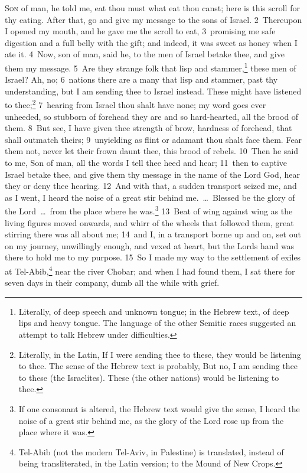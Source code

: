 \documentclass[10pt]{book} %
\begin{document}
\lettrine[lines=2]{S}{on} of man, he told me, eat thou must what eat thou canst; here is this scroll for thy eating. After that, go and give my message to the sons of Israel. \textcolor{benred8}{2}~Thereupon I opened my mouth, and he gave me the scroll to eat, \textcolor{benred8}{3}~promising me safe digestion and a full belly with the gift; and indeed, it was sweet as honey when I ate it. \textcolor{benred8}{4}~Now, son of man, said he, to the men of Israel betake thee, and give them my message. \textcolor{benred8}{5}~Are they strange folk that lisp and stammer,\footnote[1]{Literally, \textasciigrave of deep speech and unknown tongue\textquotesingle ; in the Hebrew text, \textasciigrave of deep lips and heavy tongue\textquotesingle . The language of the other Semitic races suggested an attempt to talk Hebrew under difficulties.} these men of Israel? Ah, no; \textcolor{benred8}{6}~nations there are a many that lisp and stammer, past thy understanding, but I am sending thee to Israel instead. These might have listened to thee;\footnote[2]{Literally, in the Latin, \textasciigrave If I were sending thee to these, they would be listening to thee\textquotesingle . The sense of the Hebrew text is probably, \textasciigrave But no, I am sending thee to these (the Israelites). These (the other nations) would be listening to thee\textquotesingle .} \textcolor{benred8}{7}~hearing from Israel thou shalt have none; my word goes ever unheeded, so stubborn of forehead they are and so hard-hearted, all the brood of them. \textcolor{benred8}{8}~But see, I have given thee strength of brow, hardness of forehead, that shall outmatch theirs; \textcolor{benred8}{9}~unyielding as flint or adamant thou shalt face them. Fear them not, never let their frown daunt thee, this brood of rebels.
\textcolor{benred8}{10}~Then he said to me, Son of man, all the words I tell thee heed and hear; \textcolor{benred8}{11}~then to captive Israel betake thee, and give them thy message in the name of the Lord God, hear they or deny thee hearing. \textcolor{benred8}{12}~And with that, a sudden transport seized me, and as I went, I heard the noise of a great stir behind me.~\ldots\  Blessed be the glory of the Lord~\ldots\  from the place where he was.\footnote[3]{If one consonant is altered, the Hebrew text would give the sense, \textasciigrave I heard the noise of a great stir behind me, as the glory of the Lord rose up from the place where it was\textquotesingle .} \textcolor{benred8}{13}~Beat of wing against wing as the living figures moved onwards, and whirr of the wheels that followed them, great stirring there was all about me; \textcolor{benred8}{14}~and I, in a transport borne up and on, set out on my journey, unwillingly enough, and vexed at heart, but the Lord\textquotesingle s hand was there to hold me to my purpose. \textcolor{benred8}{15}~So I made my way to the settlement of exiles at Tel-Abib,\footnote[4]{Tel-Abib (not the modern Tel-Aviv, in Palestine) is translated, instead of being transliterated, in the Latin version; \textasciigrave to the Mound of New Crops\textquotesingle .} near the river Chobar; and when I had found them, I sat there for seven days in their company, dumb all the while with grief.
\end{document}

